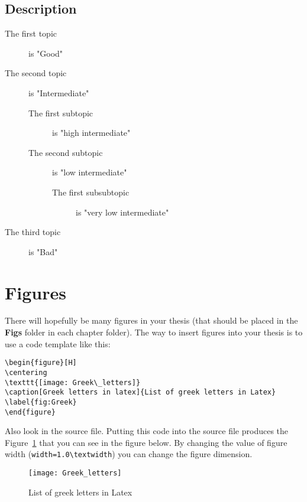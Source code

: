 \subsection{Description}
\begin{description}
	\item [The first topic] is "Good"
    \item [The second topic] is "Intermediate"
    \begin{description}
	      \item [The first subtopic] is "high intermediate"
	      \item [The second subtopic] is "low intermediate"
	      \begin{description}
		        \item [The first subsubtopic] is "very low intermediate"
	      \end{description}
\end{description}
\item [The third topic] is "Bad"
\end{description}



\section{Figures}
\label{section 2.4}
There will hopefully be many figures in your thesis (that should be placed in the \textbf{Figs} folder in each chapter folder). The way to insert figures into your thesis is to use a code template like this:
\begin{verbatim}
\begin{figure}[H] 
\centering    
\texttt{[image: Greek\_letters]}
\caption[Greek letters in latex]{List of greek letters in Latex}
\label{fig:Greek}
\end{figure}
\end{verbatim}
Also look in the source file. Putting this code into the source file produces the Figure~\ref{fig:Greek} that you can see in the figure below. By changing the value of figure width (\verb|width=1.0\textwidth|) you can change the figure dimension.

\begin{figure}[H] 
\centering    
\texttt{[image: Greek\_letters]}
\caption[Greek letters in latex]{List of greek letters in Latex}
\label{fig:Greek}
\end{figure}


